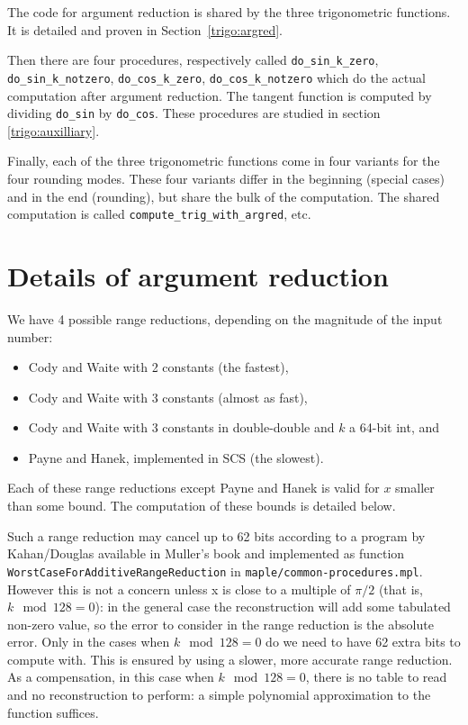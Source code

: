 The code for argument reduction is shared by the three
trigonometric functions. It is detailed and proven in
Section~\ref{trigo:argred}.

Then there are four procedures, respectively called \verb!do_sin_k_zero!,
\verb!do_sin_k_notzero!, \verb!do_cos_k_zero!, \verb!do_cos_k_notzero!
which do the actual computation after argument reduction. The tangent
function is computed by dividing \verb!do_sin! by \verb!do_cos!. These
procedures are studied in section \ref{trigo:auxilliary}.

Finally, each of the three trigonometric functions come in four variants for the four
rounding modes. These four variants differ in the beginning (special
cases) and in the end (rounding), but share the bulk of the
computation. The shared computation is  called
\verb!compute_trig_with_argred!, etc.




\section{Details of argument reduction
\label{trigo:argred}}


We have 4 possible range reductions, depending on the magnitude of the input number:

\begin{itemize}
\item Cody and Waite with 2 constants (the fastest),
\item Cody and Waite with 3 constants (almost as fast),
\item Cody and Waite with 3 constants in double-double and $k$ a
  64-bit int, and 
\item Payne and Hanek, implemented in SCS (the slowest).
\end{itemize}
Each of these range reductions except Payne and Hanek is valid for $x$
smaller than some bound. The computation of these bounds is detailed
below.

Such a range reduction may cancel up to 62 bits according to a program
by Kahan/Douglas available in Muller's book \cite{Muller97} and
implemented as function \texttt{WorstCaseForAdditiveRangeReduction} in
\texttt{maple/common-procedures.mpl}.  However this is not a concern
unless x is close to a multiple of $\pi/2$ (that is, $k \mod 128=0$): in
the general case the reconstruction will add some tabulated non-zero
value, so the error to consider in the range reduction is the absolute
error.  Only in the cases when $k \mod 128=0$ do we need to have 62
extra bits to compute with. This is ensured by using a slower, more
accurate range reduction. As a compensation, in this case when $k \mod
128=0$, there is no table to read and no reconstruction to perform: a
simple polynomial approximation to the function suffices. 

